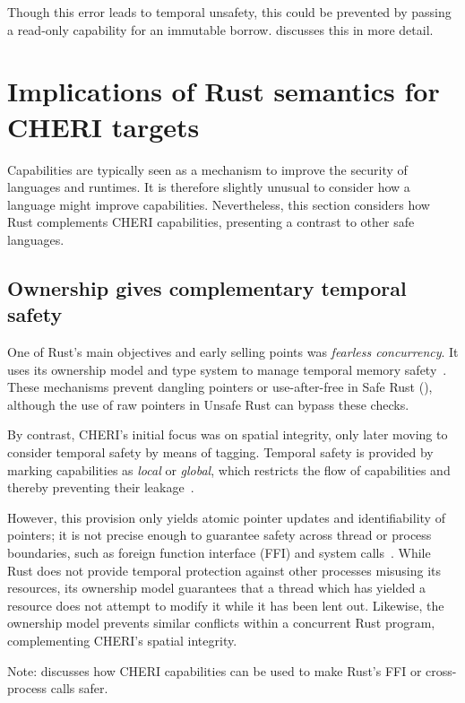 \documentclass[dissertation.tex]{subfiles}
\begin{document}
Though this error leads to temporal unsafety, this could be prevented by
passing a read-only capability for an immutable borrow.
 discusses this in more detail.


\section{Implications of Rust semantics for CHERI targets}
\label{sec:eval-cheri}

Capabilities are typically seen as a mechanism to improve the security
of languages and runtimes.
It is therefore slightly unusual to consider how a language might
improve capabilities.
Nevertheless, this section considers how Rust complements CHERI
capabilities, presenting a contrast to other safe languages.

\subsection{Ownership gives complementary temporal safety}
\label{sec:eval-cheri-spatial-temporal}

One of Rust's main objectives and early selling points was
\emph{fearless concurrency}.
It uses its ownership model and type system to manage temporal memory
safety~\cite{rust-trpl-book}.
These mechanisms prevent dangling pointers or use-after-free in Safe
Rust (), although the use of raw pointers in
Unsafe Rust can bypass these checks.

By contrast, CHERI's initial focus was on spatial integrity, only later
moving to consider temporal safety by means of tagging.
Temporal safety is provided by marking capabilities as \emph{local} or
\emph{global}, which restricts the flow of capabilities and thereby
preventing their leakage~\cite{cheri2015}.

However, this provision only yields atomic pointer updates and
identifiability of pointers;
it is not precise enough to guarantee safety across thread or process
boundaries, such as foreign function interface (FFI) and system
calls~\cite{cheri-2019-abstract}.
While Rust does not provide temporal protection against other processes
misusing its resources, its ownership model guarantees that a thread
which has yielded a resource does not attempt to modify it while it has
been lent out.
Likewise, the ownership model prevents similar conflicts within a
concurrent Rust program, complementing CHERI's spatial integrity.

Note:  discusses how CHERI capabilities can
be used to make Rust's FFI or cross-process calls safer.
\end{document}
